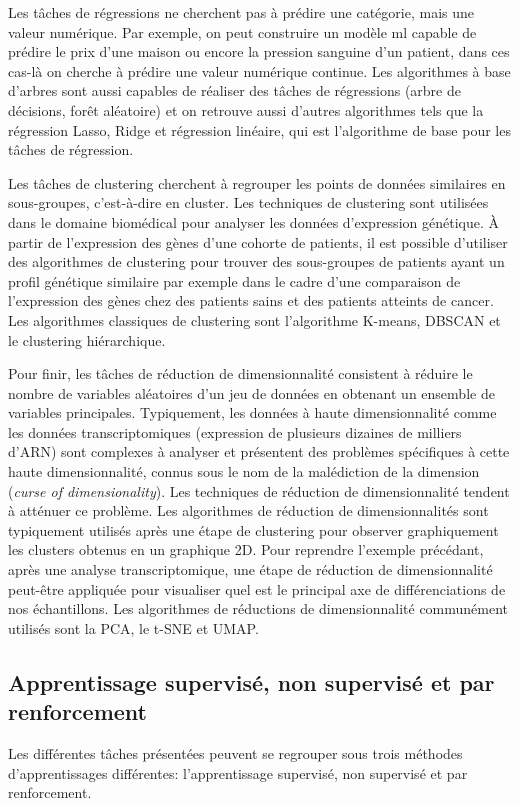 Les tâches de régressions ne cherchent pas à prédire une catégorie, mais une valeur numérique. Par exemple, on peut construire un modèle \gls{ml} capable de prédire le prix d'une maison ou encore la pression sanguine d'un patient, dans ces cas-là on cherche à prédire une valeur numérique continue. Les algorithmes à base d'arbres sont aussi capables de réaliser des tâches de régressions (arbre de décisions, forêt aléatoire) et on retrouve aussi d'autres algorithmes tels que la régression Lasso, Ridge et régression linéaire, qui est l'algorithme de base pour les tâches de régression.

Les tâches de clustering cherchent à regrouper les points de données similaires en sous-groupes, c'est-à-dire en cluster. Les techniques de clustering sont utilisées dans le domaine biomédical pour analyser les données d'expression génétique. À partir de l'expression des gènes d'une cohorte de patients, il est possible d'utiliser des algorithmes de clustering pour trouver des sous-groupes de patients ayant un profil génétique similaire par exemple dans le cadre d'une comparaison de l'expression des gènes chez des patients sains et des patients atteints de cancer. Les algorithmes classiques de clustering sont l'algorithme K-means, DBSCAN et le clustering hiérarchique.

Pour finir, les tâches de réduction de dimensionnalité consistent à réduire le nombre de variables aléatoires d'un jeu de données en obtenant un ensemble de variables principales. Typiquement, les données à haute dimensionnalité comme les données transcriptomiques (expression de plusieurs dizaines de milliers d'ARN) sont complexes à analyser et présentent des problèmes spécifiques à cette haute dimensionnalité, connus sous le nom de la malédiction de la dimension (\textit{curse of dimensionality}). Les techniques de réduction de dimensionnalité tendent à atténuer ce problème. Les algorithmes de réduction de dimensionnalités sont typiquement utilisés après une étape de clustering pour observer graphiquement les clusters obtenus en un graphique 2D. Pour reprendre l'exemple précédant, après une analyse transcriptomique, une étape de réduction de dimensionnalité peut-être appliquée pour visualiser quel est le principal axe de différenciations de nos échantillons. Les algorithmes de réductions de dimensionnalité communément utilisés sont la PCA, le t-SNE et UMAP.

\subsection{Apprentissage supervisé, non supervisé et par renforcement}
Les différentes tâches présentées peuvent se regrouper sous trois méthodes d'apprentissages différentes: l'apprentissage supervisé, non supervisé et par renforcement.

